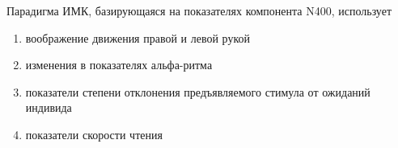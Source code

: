 
Парадигма ИМК, базирующаяся на показателях компонента N400, использует

\begin{enumerate}
    \item воображение движения правой и левой рукой
    \item изменения в показателях альфа-ритма
    \item показатели степени отклонения предъявляемого стимула от ожиданий индивида
    \item показатели скорости чтения
\end{enumerate}